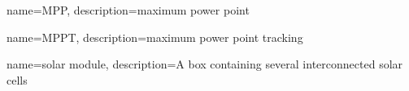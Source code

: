 {
  name=MPP,
  description={maximum power point}
}

{
  name=MPPT,
  description={maximum power point tracking}
}

{
  name=solar module,
  description={A box containing several interconnected solar cells}
}

\makeglossaries
\glsaddall
